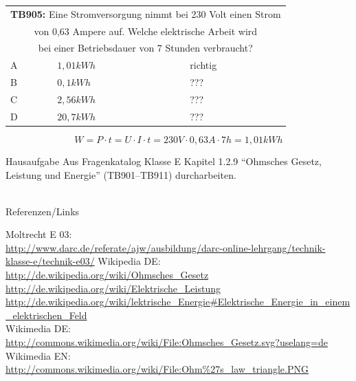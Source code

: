 \begin{frame}
	\begin{small}	
	\begin{tabular}{|l|l|l|}
	\hline
		\multicolumn{3}{|c|}{\textbf{TB905:} Eine Stromversorgung nimmt bei 230 Volt einen Strom }\\
		\multicolumn{3}{|c|}{von 0,63 Ampere auf. Welche elektrische Arbeit  wird }\\
		\multicolumn{3}{|c|}{bei einer Betriebsdauer von 7 Stunden verbraucht?}\\
		\hline
		A & $1,01 kWh$ & richtig \\ \hline
		B & $0,1 kWh $ & ??? \\ \hline
		C & $2,56 kWh$ & ??? \\ \hline
		D & $20,7 kWh$ & ??? \\ \hline	
	\end{tabular}
	\end{small}
	\vspace{1cm}
	\begin{equation}
		W = P \cdot t = U \cdot I \cdot t = 230V \cdot 0,63A \cdot 7h = 1,01kWh
	\end{equation}
\end{frame}

\begin{frame}
  \begin{alertblock}{Hausaufgabe}
    Aus Fragenkatalog Klasse E Kapitel 1.2.9 ``Ohmsches Gesetz, Leistung und Energie'' (TB901--TB911) durcharbeiten.
  \end{alertblock}
\end{frame}

\renewcommand{\refname}{Referenzen}

\hypertarget{refs}{}
\textcolor{white}{} \\ %
\Large Referenzen/Links
\footnotesize

\begin{thebibliography}{}
       Moltrecht E 03: \\
                    \url{http://www.darc.de/referate/ajw/ausbildung/darc-online-lehrgang/technik-klasse-e/technik-e03/}
        Wikipedia DE: \\
                    \url{http://de.wikipedia.org/wiki/Ohmsches_Gesetz}\\ 
                    \url{http://de.wikipedia.org/wiki/Elektrische_Leistung}\\ 
                    \url{http://de.wikipedia.org/wiki/lektrische_Energie#Elektrische_Energie_in_einem_elektrischen_Feld}\\ 
    	Wikimedia DE:\\
    				\url{http://commons.wikimedia.org/wiki/File:Ohmsches_Gesetz.svg?uselang=de}\\
   		Wikimedia EN:\\
   					\url{http://commons.wikimedia.org/wiki/File:Ohm\%27s_law_triangle.PNG}\\
\end{thebibliography} 


